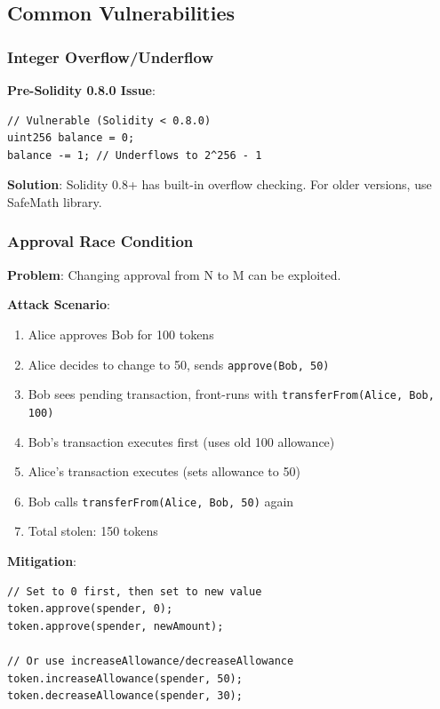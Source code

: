 \documentclass[11pt,a4paper]{article}
\begin{document}
\subsection{Common Vulnerabilities}

\subsubsection{Integer Overflow/Underflow}

\textbf{Pre-Solidity 0.8.0 Issue}:
\begin{lstlisting}[language=Solidity]
// Vulnerable (Solidity < 0.8.0)
uint256 balance = 0;
balance -= 1; // Underflows to 2^256 - 1
\end{lstlisting}

\textbf{Solution}: Solidity 0.8+ has built-in overflow checking. For older versions, use SafeMath library.

\subsubsection{Approval Race Condition}

\textbf{Problem}: Changing approval from N to M can be exploited.

\textbf{Attack Scenario}:
\begin{enumerate}
  \item Alice approves Bob for 100 tokens
  \item Alice decides to change to 50, sends \texttt{approve(Bob, 50)}
  \item Bob sees pending transaction, front-runs with \texttt{transferFrom(Alice, Bob, 100)}
  \item Bob's transaction executes first (uses old 100 allowance)
  \item Alice's transaction executes (sets allowance to 50)
  \item Bob calls \texttt{transferFrom(Alice, Bob, 50)} again
  \item Total stolen: 150 tokens
\end{enumerate}

\textbf{Mitigation}:
\begin{lstlisting}[language=Solidity]
// Set to 0 first, then set to new value
token.approve(spender, 0);
token.approve(spender, newAmount);

// Or use increaseAllowance/decreaseAllowance
token.increaseAllowance(spender, 50);
token.decreaseAllowance(spender, 30);
\end{lstlisting}
\end{document}
